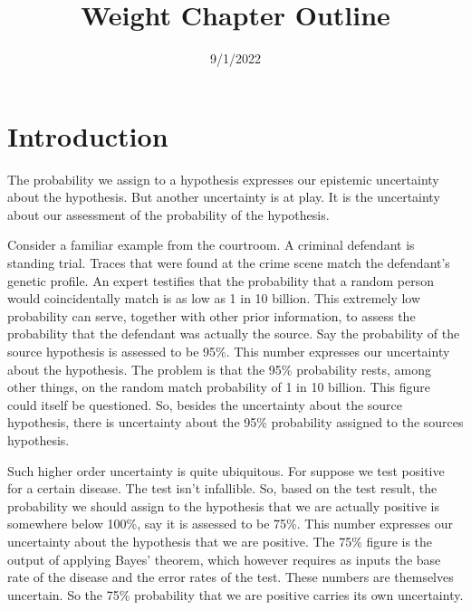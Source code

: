 \documentclass[
  10pt,
  dvipsnames,enabledeprecatedfontcommands]{scrartcl}
\title{Weight Chapter Outline}
\author{}
\date{\vspace{-2.5em}9/1/2022}
\begin{document}
\maketitle

{
\hypersetup{linkcolor=}
\setcounter{tocdepth}{2}
\tableofcontents
}
\hypertarget{introduction}{%
\section{Introduction}\label{introduction}}

The probability we assign to a hypothesis expresses our epistemic
uncertainty about the hypothesis. But another uncertainty is at play. It
is the uncertainty about our assessment of the probability of the
hypothesis.

Consider a familiar example from the courtroom. A criminal defendant is
standing trial. Traces that were found at the crime scene match the
defendant's genetic profile. An expert testifies that the probability
that a random person would coincidentally match is as low as 1 in 10
billion. This extremely low probability can serve, together with other
prior information, to assess the probability that the defendant was
actually the source. Say the probability of the source hypothesis is
assessed to be 95\%. This number expresses our uncertainty about the
hypothesis. The problem is that the
95\%
probability rests, among other things, on the random match probability
of 1 in 10 billion. This figure could itself be questioned. So, besides
the uncertainty about the source hypothesis, there is uncertainty about
the 95\% probability assigned to the sources hypothesis.

Such higher order uncertainty is quite ubiquitous. For suppose we test
positive for a certain disease. The test isn't infallible. So, based on
the test result, the probability we should assign to the hypothesis that
we are actually positive is somewhere below 100\%, say it is assessed to
be 75\%. This number expresses our uncertainty about the hypothesis that
we are positive. The 75\% figure is the output of applying Bayes'
theorem, which however requires as inputs the base rate of the disease
and the error rates of the test. These numbers are themselves uncertain.
So the 75\% probability that we are positive carries its own
uncertainty.
\end{document}

